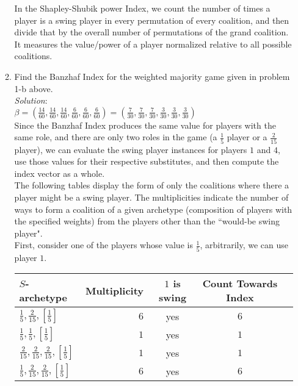 \documentclass{article}
\begin{document}
\begin{enumerate}
\begin{enumerate}
  In the Shapley-Shubik power Index, we count the number of times a player is a swing player in every permutation of every coalition, and then divide that by the overall number of permutations of the grand coalition. It measures the value/power of a player normalized relative to all possible coalitions. \\

  \item Find the Banzhaf Index for the weighted majority game given in problem 1-b above. \\

  \textit{Solution}:\\

  $ \beta
      = (\frac{14}{60}, \frac{14}{60}, \frac{14}{60}, \frac{6}{60}, \frac{6}{60}, \frac{6}{60})
      = (\frac{7}{30}, \frac{7}{30}, \frac{7}{30}, \frac{3}{30}, \frac{3}{30}, \frac{3}{30})$ \\

  Since the Banzhaf Index produces the same value for players with the same role, and there are only two roles in the game (a $\frac{1}{5}$ player or a $\frac{2}{15}$ player), we can evaluate the swing player instances for players $1$ and $4$, use those values for their respective substitutes, and then compute the index vector as a whole. \\

  The following tables display the form of only the coalitions where there a player might be a swing player. The multiplicities indicate the number of ways to form a coalition of a given archetype (composition of players with the specified weights) from the players other than the ``would-be swing player". \\

  First, consider one of the players whose value is $\frac{1}{5}$, arbitrarily, we can use player $1$. \\

  \begin{tabular}{| l | r || c | c | c |}
  \hline
  $S$-archetype                                             & Multiplicity     & $1$ is swing & Count Towards Index \\
  \hline\hline
  $\frac{1}{5}, \frac{2}{15}, [\frac{1}{5}]$                & $6$              & yes          & $6$                 \\
  \hline
  $\frac{1}{5}, \frac{1}{5}, [\frac{1}{5}]$                 & $1$              & yes          & $1$                 \\
  \hline
  $\frac{2}{15}, \frac{2}{15}, \frac{2}{15}, [\frac{1}{5}]$ & $1$              & yes          & $1$                 \\
  \hline
  $\frac{1}{5}, \frac{2}{15}, \frac{2}{15}, [\frac{1}{5}]$  & $6$              & yes          & $6$                 \\
  \hline
  \end{tabular} \\


\end{enumerate}
\end{enumerate}
\end{document}
